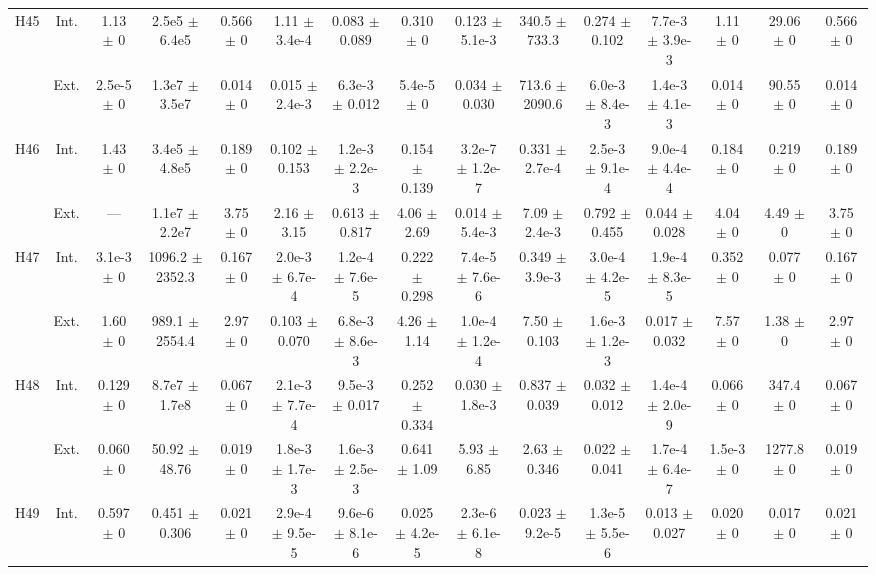 \begin{table}[htbp]
{\begin{tabular}{@{}ccccccccccccccc@{}}
\cline{2-15}
\multirow{2}{*}{H45} & Int. & 1.13 $\pm$ 0 & 2.5e5 $\pm$ 6.4e5 & 0.566 $\pm$ 0 & 1.11 $\pm$ 3.4e-4 & 0.083 $\pm$ 0.089 & 0.310 $\pm$ 0 & 0.123 $\pm$ 5.1e-3 & 340.5 $\pm$ 733.3 & 0.274 $\pm$ 0.102 & 7.7e-3 $\pm$ 3.9e-3 & 1.11 $\pm$ 0 & 29.06 $\pm$ 0 & 0.566 $\pm$ 0 \\
 & Ext. & 2.5e-5 $\pm$ 0 & 1.3e7 $\pm$ 3.5e7 & 0.014 $\pm$ 0 & 0.015 $\pm$ 2.4e-3 & 6.3e-3 $\pm$ 0.012 & 5.4e-5 $\pm$ 0 & 0.034 $\pm$ 0.030 & 713.6 $\pm$ 2090.6 & 6.0e-3 $\pm$ 8.4e-3 & 1.4e-3 $\pm$ 4.1e-3 & 0.014 $\pm$ 0 & 90.55 $\pm$ 0 & 0.014 $\pm$ 0 \\
\cline{2-15}
\multirow{2}{*}{H46} & Int. & 1.43 $\pm$ 0 & 3.4e5 $\pm$ 4.8e5 & 0.189 $\pm$ 0 & 0.102 $\pm$ 0.153 & 1.2e-3 $\pm$ 2.2e-3 & 0.154 $\pm$ 0.139 & 3.2e-7 $\pm$ 1.2e-7 & 0.331 $\pm$ 2.7e-4 & 2.5e-3 $\pm$ 9.1e-4 & 9.0e-4 $\pm$ 4.4e-4 & 0.184 $\pm$ 0 & 0.219 $\pm$ 0 & 0.189 $\pm$ 0 \\
 & Ext. & --- & 1.1e7 $\pm$ 2.2e7 & 3.75 $\pm$ 0 & 2.16 $\pm$ 3.15 & 0.613 $\pm$ 0.817 & 4.06 $\pm$ 2.69 & 0.014 $\pm$ 5.4e-3 & 7.09 $\pm$ 2.4e-3 & 0.792 $\pm$ 0.455 & 0.044 $\pm$ 0.028 & 4.04 $\pm$ 0 & 4.49 $\pm$ 0 & 3.75 $\pm$ 0 \\
\cline{2-15}
\multirow{2}{*}{H47} & Int. & 3.1e-3 $\pm$ 0 & 1096.2 $\pm$ 2352.3 & 0.167 $\pm$ 0 & 2.0e-3 $\pm$ 6.7e-4 & 1.2e-4 $\pm$ 7.6e-5 & 0.222 $\pm$ 0.298 & 7.4e-5 $\pm$ 7.6e-6 & 0.349 $\pm$ 3.9e-3 & 3.0e-4 $\pm$ 4.2e-5 & 1.9e-4 $\pm$ 8.3e-5 & 0.352 $\pm$ 0 & 0.077 $\pm$ 0 & 0.167 $\pm$ 0 \\
 & Ext. & 1.60 $\pm$ 0 & 989.1 $\pm$ 2554.4 & 2.97 $\pm$ 0 & 0.103 $\pm$ 0.070 & 6.8e-3 $\pm$ 8.6e-3 & 4.26 $\pm$ 1.14 & 1.0e-4 $\pm$ 1.2e-4 & 7.50 $\pm$ 0.103 & 1.6e-3 $\pm$ 1.2e-3 & 0.017 $\pm$ 0.032 & 7.57 $\pm$ 0 & 1.38 $\pm$ 0 & 2.97 $\pm$ 0 \\
\cline{2-15}
\multirow{2}{*}{H48} & Int. & 0.129 $\pm$ 0 & 8.7e7 $\pm$ 1.7e8 & 0.067 $\pm$ 0 & 2.1e-3 $\pm$ 7.7e-4 & 9.5e-3 $\pm$ 0.017 & 0.252 $\pm$ 0.334 & 0.030 $\pm$ 1.8e-3 & 0.837 $\pm$ 0.039 & 0.032 $\pm$ 0.012 & 1.4e-4 $\pm$ 2.0e-9 & 0.066 $\pm$ 0 & 347.4 $\pm$ 0 & 0.067 $\pm$ 0 \\
 & Ext. & 0.060 $\pm$ 0 & 50.92 $\pm$ 48.76 & 0.019 $\pm$ 0 & 1.8e-3 $\pm$ 1.7e-3 & 1.6e-3 $\pm$ 2.5e-3 & 0.641 $\pm$ 1.09 & 5.93 $\pm$ 6.85 & 2.63 $\pm$ 0.346 & 0.022 $\pm$ 0.041 & 1.7e-4 $\pm$ 6.4e-7 & 1.5e-3 $\pm$ 0 & 1277.8 $\pm$ 0 & 0.019 $\pm$ 0 \\
\cline{2-15}
\multirow{2}{*}{H49} & Int. & 0.597 $\pm$ 0 & 0.451 $\pm$ 0.306 & 0.021 $\pm$ 0 & 2.9e-4 $\pm$ 9.5e-5 & 9.6e-6 $\pm$ 8.1e-6 & 0.025 $\pm$ 4.2e-5 & 2.3e-6 $\pm$ 6.1e-8 & 0.023 $\pm$ 9.2e-5 & 1.3e-5 $\pm$ 5.5e-6 & 0.013 $\pm$ 0.027 & 0.020 $\pm$ 0 & 0.017 $\pm$ 0 & 0.021 $\pm$ 0 \\

\end{tabular}}
\end{table}
